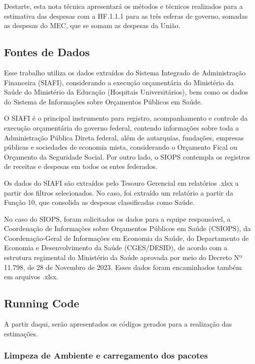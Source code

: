 \documentclass[
  letterpaper,
  DIV=11,
  numbers=noendperiod]{scrartcl}
\begin{document}
Destarte, esta nota técnica apresentará os métodos e técnicos realizados
para a estimativa das despesas com a HF.1.1.1 para as três esferas de
governo, somadas as despesas do MEC, que se somam as despesas da União.

\hypertarget{fontes-de-dados}{%
\subsection{Fontes de Dados}\label{fontes-de-dados}}

Esse trabalho utiliza os dados extraídos do Sistema Integrado de
Administração Financeira (SIAFI), considerando a execução orçamentária
do Ministério da Saúde do Ministério da Educação (Hospitais
Universitários), bem como os dados do Sistema de Informações sobre
Orçamentos Públicos em Saúde.

O SIAFI é o principal instrumento para registro, acompanhamento e
controle da execução orçamentária do governo federal, contendo
informações sobre toda a Administração Pública Direta federal, além de
autarquias, fundações, empresas públicas e sociedades de economia mista,
considerando o Orçamento Fical ou Orçamento da Seguridade Social. Por
outro lado, o SIOPS contempla os registros de receitas e despesas em
todos os entes federados.

Os dados do SIAFI são extraídos pelo Tesouro Gerencial em relatórios
.xlsx a partir dos filtros selecionados. No caso, foi extraído um
relatório a partir da Função 10, que consolida as despesas classificadas
como Saúde.

No caso do SIOPS, foram solicitados os dados para a equipe responsável,
a Coordenação de Informações sobre Orçamentos Públicos em Saúde
(CSIOPS), da Coordenação-Geral de Informações em Economia da Saúde, do
Departamento de Economia e Desenvolvimento da Saúde (CGES/DESID), de
acordo com a estrutura regimental do Ministério da Saúde aprovada por
meio do Decreto Nº 11.798, de 28 de Novembro de 2023. Esses dados foram
encaminhados também em arquivos .xlsx.

\hypertarget{running-code}{%
\subsection{Running Code}\label{running-code}}

A partir daqui, serão apresentados os códigos gerados para a realização
das estimações.

\hypertarget{limpeza-de-ambiente-e-carregamento-dos-pacotes}{%
\subsubsection{Limpeza de Ambiente e carregamento dos
pacotes}\label{limpeza-de-ambiente-e-carregamento-dos-pacotes}}
\end{document}
